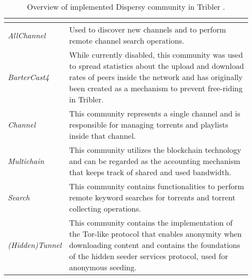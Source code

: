 \begin{table}[tbp]
	\centering
	\caption{Overview of implemented Dispersy community in Tribler \cite{2016:tribler-techdebt:vos}.}
	\label{tbl:community}
	\begin{tabular}{|l|p{11cm}|}
		\hline
		\rowcolor[HTML]{EFEFEF} 
		\multicolumn{1}{|c|}{\cellcolor[HTML]{EFEFEF}{\color[HTML]{333333} \textbf{Community Name}}} & \multicolumn{1}{c|}{\cellcolor[HTML]{EFEFEF}{\color[HTML]{333333} \textbf{Purpose}}}                                                                                                                                     \\ \hline
		\textit{AllChannel}                                                                          & Used to discover new channels and to perform remote channel search operations.                                                                                                                                           \\ \hline
		\textit{BarterCast4}                                                                         & While currently disabled, this community was used to spread statistics about the upload and download rates of peers inside the network and has originally been created as a mechanism to prevent free-riding in Tribler. \\ \hline
		\textit{Channel}                                                                             & This community represents a single channel and is responsible for managing torrents and playlists inside that channel.                                                                                                   \\ \hline
		\textit{Multichain}                                                                          & This community utilizes the blockchain technology and can be regarded as the accounting mechanism that keeps track of shared and used bandwidth.                                                                         \\ \hline
		\textit{Search}                                                                              & This community contains functionalities to perform remote keyword searches for torrents and torrent collecting operations.                                                                                               \\ \hline
		\textit{(Hidden)Tunnel}                                                                      & This community contains the implementation of the Tor-like protocol that enables anonymity when downloading content and contains the foundations of the hidden seeder services protocol, used for anonymous seeding.     \\ \hline
	\end{tabular}
\end{table}


